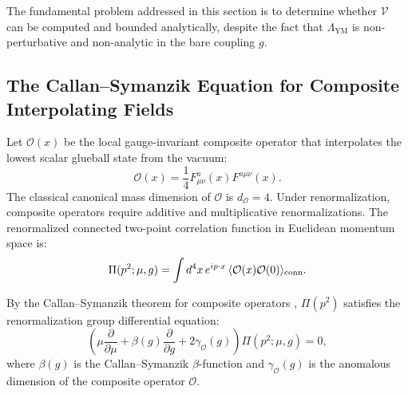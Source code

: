 The fundamental problem addressed in this section is to determine whether $\mathcal{V}$ can be computed and bounded analytically, despite the fact that $\Lambda_{\mathrm{YM}}$ is non-perturbative and non-analytic in the bare coupling $g$.

\subsection{The Callan--Symanzik Equation for Composite Interpolating Fields}
\label{subsec:cs_composite_fields}

Let $\mathcal{O}(x)$ be the local gauge-invariant composite operator that interpolates the lowest scalar glueball state from the vacuum:
\begin{equation}
\label{eq:ch9_interpolating_glueball}
\mathcal{O}(x) = \frac{1}{4} F_{\mu\nu}^a(x) F^{a\mu\nu}(x).
\end{equation}
The classical canonical mass dimension of $\mathcal{O}$ is $d_{\mathcal{O}} = 4$. Under renormalization, composite operators require additive and multiplicative renormalizations. The renormalized connected two-point correlation function in Euclidean momentum space is:
\begin{equation}
\label{eq:ch9_renormalized_correlator}
\Pi(p^2; \mu, g) = \int d^4x \, e^{i p \cdot x} \, \langle \mathcal{O}(x) \mathcal{O}(0) \rangle_{\mathrm{conn}}.
\end{equation}

By the Callan--Symanzik theorem for composite operators \cite{Callan1970,Symanzik1970}, $\Pi(p^2)$ satisfies the renormalization group differential equation:
\begin{equation}
\label{eq:ch9_callan_symanzik_pi}
\left( \mu \frac{\partial}{\partial \mu} + \beta(g) \frac{\partial}{\partial g} + 2 \gamma_{\mathcal{O}}(g) \right) \Pi(p^2; \mu, g) = 0,
\end{equation}
where $\beta(g)$ is the Callan--Symanzik $\beta$-function and $\gamma_{\mathcal{O}}(g)$ is the anomalous dimension of the composite operator $\mathcal{O}$.

